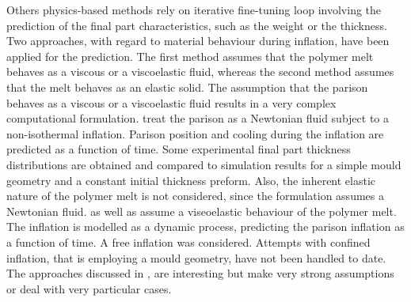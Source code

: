 Others physics-based methods rely on iterative fine-tuning loop involving the prediction of the final part characteristics, such as the weight or the thickness. Two approaches, with regard to material behaviour during inflation, have been applied for the prediction. The first method assumes that the polymer melt behaves as a viscous or a viscoelastic fluid, whereas the second method assumes that the melt behaves as an elastic solid. The assumption that the parison behaves as a viscous or a viscoelastic fluid results in a very complex computational formulation. \citep{poslinski1990nonisothermal} treat the parison as a Newtonian fluid subject to a non-isothermal inflation. Parison position and cooling during the inflation are predicted as a function of time. Some experimental final part thickness distributions are obtained and compared to simulation results for a simple mould geometry and a constant initial thickness preform. Also, the inherent elastic nature of the polymer
melt is not considered, since the formulation assumes a Newtonian fluid. \cite{ryan1982dynamics} as well as \citep{khayat1992inflation} assume a viseoelastic behaviour of the polymer melt. The inflation is modelled as a dynamic process, predicting the parison inflation as a function of time. A free inflation was considered. Attempts with confined inflation, that is employing a mould geometry, have not been handled to date. 
The approaches discussed in \citep{poslinski1990nonisothermal}, \cite{ryan1982dynamics} \citep{khayat1992inflation} are interesting but make very strong assumptions or deal with very particular cases.


